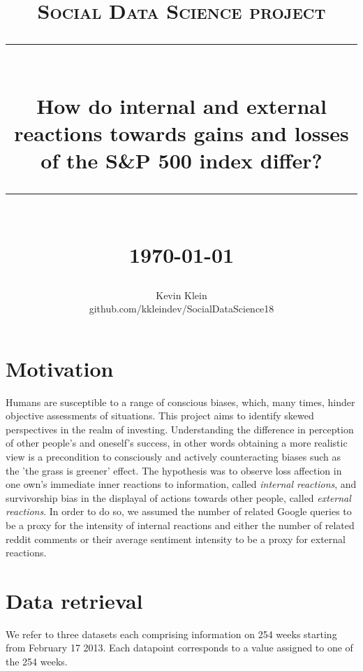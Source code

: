 \documentclass[12pt]{article}
\newcommand{\HRule}[1]{\rule{\linewidth}{#1}}
\begin{document}
\title{ \normalsize \textsc{Social Data Science project}
		\HRule{0.5pt} \\
		\LARGE How do internal and external reactions towards gains and losses of the S\&P 500 index differ?
		\HRule{2pt} \\ [0.5cm]
		\normalsize \today \vspace*{5\baselineskip}}

\date{}

\author{
		Kevin Klein \\
		github.com/kkleindev/SocialDataScience18}

\maketitle
\newpage

\sectionfont{\scshape}


\section{Motivation}
Humans are susceptible to a range of conscious biases\cite{evolution, kahneman}, which, many times, hinder objective assessments of situations. This project aims to identify skewed perspectives in the realm of investing. Understanding the difference in perception of other people's and oneself's success,
in other words obtaining a more realistic view is a precondition to consciously and actively counteracting biases such as the 'the grass is greener' effect. The hypothesis was to observe loss affection in one own's immediate inner reactions to information, called \emph{internal reactions}, and survivorship bias in the displayal of actions towards other people, called \emph{external reactions}. In order to do so, we assumed the number of related Google queries to be a proxy for the intensity of internal reactions and either the number of related reddit comments or their average sentiment intensity to be a proxy for external reactions.
\section{Data retrieval}
We refer to three datasets each comprising information on 254 weeks starting from February 17 2013. Each datapoint corresponds to a value assigned to one of the 254 weeks.
\end{document}

